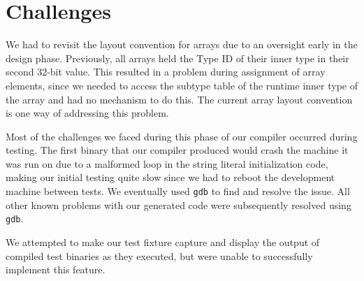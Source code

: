 \documentclass[12pt]{article}
\newcommand{\code}[1]{\texttt{#1}}
\begin{document}
\section{Challenges}

We had to revisit the layout convention for arrays due to an oversight early in the design phase.  Previously, all arrays held the Type ID of their inner type in their second 32-bit value.  This resulted in a problem during assignment of array elements, since we needed to access the subtype table of the runtime inner type of the array and had no mechanism to do this.  The current array layout convention is one way of addressing this problem.

Most of the challenges we faced during this phase of our compiler occurred during testing.  The first binary that our compiler produced would crash the machine it was run on due to a malformed loop in the string literal initialization code, making our initial testing quite slow since we had to reboot the development machine between tests.  We eventually used \code{gdb} to find and resolve the issue.  All other known problems with our generated code were subsequently resolved using \code{gdb}.

We attempted to make our test fixture capture and display the output of compiled test binaries as they executed, but were unable to successfully implement this feature.
\end{document}
